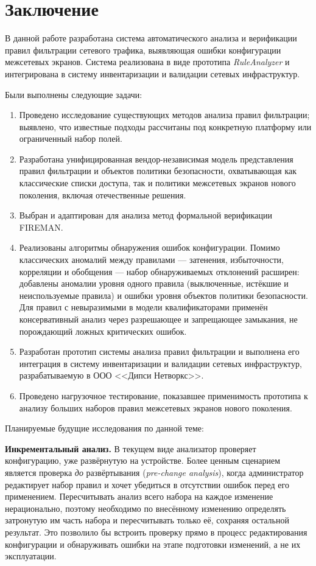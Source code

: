 \section{Заключение}
\label{sec:Section5} 

В данной работе разработана система автоматического анализа и верификации правил фильтрации сетевого трафика, выявляющая ошибки конфигурации межсетевых экранов. Система реализована в виде прототипа \textit{RuleAnalyzer} и интегрирована в систему инвентаризации и валидации сетевых инфраструктур.

Были выполнены следующие задачи:
\begin{enumerate}
    \item Проведено исследование существующих методов анализа правил фильтрации; выявлено, что известные подходы рассчитаны под конкретную платформу или ограниченный набор полей.
    \item Разработана унифицированная вендор-независимая модель представления правил фильтрации и объектов политики безопасности, охватывающая как классические списки доступа, так и политики межсетевых экранов нового поколения, включая отечественные решения.
    \item Выбран и адаптирован для анализа метод формальной верификации FIREMAN.
    \item Реализованы алгоритмы обнаружения ошибок конфигурации. Помимо классических аномалий между правилами --- затенения, избыточности, корреляции и обобщения --- набор обнаруживаемых отклонений расширен: добавлены аномалии уровня одного правила (выключенные, истёкшие и неиспользуемые правила) и ошибки уровня объектов политики безопасности. Для правил с невыразимыми в модели квалификаторами применён консервативный анализ через разрешающее и запрещающее замыкания, не порождающий ложных критических ошибок.
    \item Разработан прототип системы анализа правил фильтрации и выполнена его интеграция в систему инвентаризации и валидации сетевых инфраструктур, разрабатываемую в ООО <<Дипси Нетворкс>>.
    \item Проведено нагрузочное тестирование, показавшее применимость прототипа к анализу больших наборов правил межсетевых экранов нового поколения.
\end{enumerate}

Планируемые будущие исследования по данной теме:

\textbf{Инкрементальный анализ.} В текущем виде анализатор проверяет конфигурацию, уже развёрнутую на устройстве. Более ценным сценарием является проверка \emph{до} развёртывания (\emph{pre-change analysis}), когда администратор редактирует набор правил и хочет убедиться в отсутствии ошибок перед его применением. Пересчитывать анализ всего набора на каждое изменение нерационально, поэтому необходимо по внесённому изменению определять затронутую им часть набора и пересчитывать только её, сохраняя остальной результат. Это позволило бы встроить проверку прямо в процесс редактирования конфигурации и обнаруживать ошибки на этапе подготовки изменений, а не их эксплуатации.

